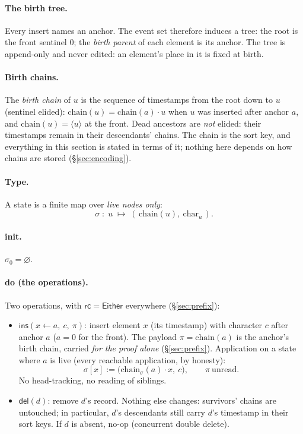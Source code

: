 \documentclass[11pt]{article}
\newcommand{\del}{\mathsf{del}}
\newcommand{\ins}{\mathsf{ins}}
\newcommand{\rc}{\mathsf{rc}}
\newcommand{\Either}{\textsf{Either}}
\newcommand{\chain}{\mathrm{chain}}
\begin{document}
\paragraph{The birth tree.} Every insert names an anchor. The event
set therefore induces a tree: the root is the front sentinel $0$; the
\emph{birth parent} of each element is its anchor. The tree is
append-only and never edited: an element's place in it is fixed at
birth.

\paragraph{Birth chains.} The \emph{birth chain} of $u$ is the
sequence of timestamps from the root down to $u$ (sentinel elided):
$\chain(u) = \chain(a) \cdot u$ when $u$ was inserted after anchor
$a$, and $\chain(u) = \langle u \rangle$ at the front. Dead ancestors
are \emph{not} elided: their timestamps remain in their descendants'
chains. The chain is the sort key, and everything in this section is
stated in terms of it; nothing here depends on how chains are stored
(\S\ref{sec:encoding}).

\paragraph{Type.} A state is a finite map over \emph{live nodes only}:
\[
  \sigma \;:\; u \;\mapsto\; (\,\chain(u),\ \mathrm{char}_u\,).
\]

\paragraph{init.} $\sigma_0 = \varnothing$.

\paragraph{do (the operations).} Two operations, with $\rc = \Either$
everywhere (\S\ref{sec:prefix}):
\begin{itemize}
\item $\ins(x \leftarrow a,\ c,\ \pi)$: insert element $x$ (its
timestamp) with character $c$ after anchor $a$ ($a = 0$ for the
front). The payload $\pi = \chain(a)$ is the anchor's birth chain,
carried \emph{for the proof alone} (\S\ref{sec:prefix}). Application
on a state where $a$ is live (every reachable application, by
honesty):
\[
  \sigma[x] := \bigl(\chain_\sigma(a) \cdot x,\ c\bigr),
  \qquad \pi\ \text{unread}.
\]
No head-tracking, no reading of siblings.
\item $\del(d)$: remove $d$'s record. Nothing else changes:
survivors' chains are untouched; in particular, $d$'s descendants
still carry $d$'s timestamp in their sort keys. If $d$ is absent,
no-op (concurrent double delete).
\end{itemize}
\end{document}
